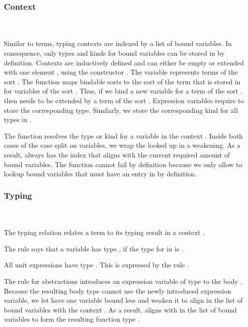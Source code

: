 \subsubsection{Context}\hfill\\\\
Similar to terms, typing contexts  are indexed by a list of bound variables.
In consequence, only types and kinds for bound variables can be stored in  by definition.
\FCtx
Contexts are inductively defined and can either be empty  or extended with one element , using the constructor   .
The variable  represents terms of the sort  . 
\noindent The function  maps bindable sorts  to the sort of the term that is stored in  for variables of the sort . Thus, if we bind a new variable for a term of the sort , then  needs to be extended by a term of the sort  .
\Fkind
Expression variables require  to store the corresponding type. 
Similarly, we store the corresponding kind for all types in .

\noindent The  function resolves the type or kind  for a variable in the context .
\Flookup
Inside both cases of the case split on variables, we wrap the looked up  in a weakening. 
As a result,  always has the index  that aligns with the current required amount of bound variables. 
The  function cannot fail by definition because we only allow to lookup bound variables that must have an entry in  by definition.

\subsubsection{Typing}\hfill\\\\
The typing relation    \Data{:}  relates a term  to its typing result  in a context .

\newpage

\FTyping
The rule  says that a variable   has type , if the type for  in  is . 

\noindent All unit expressions  have type . This is expressed by the rule .

\noindent The rule for abstractions  introduces an expression variable of type  to the body . 
Because the resulting body type  cannot use the newly introduced expression variable, we let  have one variable bound less and weaken it to align in the list of bound variables with the context   . 
As a result,  aligns with  in the list of bound variables to form the resulting function type   . 

